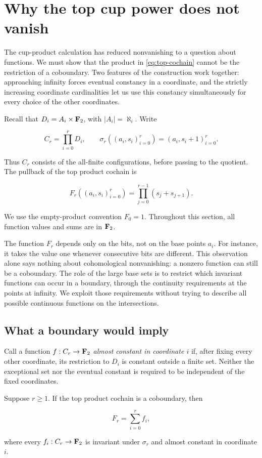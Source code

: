 \section{Why the top cup power does not vanish}\label{sec:nonvanishing}

The cup-product calculation has reduced nonvanishing to a question about
functions.  We must show that the product in \eqref{eq:top-cochain} cannot be
the restriction of a coboundary.  Two features of the construction work
together: approaching infinity forces eventual constancy in a coordinate,
and the strictly increasing coordinate cardinalities let us use this
constancy simultaneously for every choice of the other coordinates.

Recall that \(D_i=A_i\times\mathbf F_2\), with \(|A_i|=\aleph_i\).  Write

\[
C_r=\prod_{i=0}^{r}D_i,
\qquad
\sigma_r((a_i,s_i)_{i=0}^{r})=(a_i,s_i+1)_{i=0}^{r}.
\]

Thus \(C_r\) consists of the all-finite configurations, before passing to
the quotient.  The pullback of the top product cochain is

\[
F_r((a_i,s_i)_{i=0}^{r})
=\prod_{j=0}^{r-1}(s_j+s_{j+1}).
\]

We use the empty-product convention \(F_0=1\).  Throughout this section,
all function values and sums are in \(\mathbf F_2\).

The function \(F_r\) depends only on the bits, not on the base points
\(a_i\).  For instance, it takes the value one whenever consecutive bits
are different.  This observation alone says nothing about cohomological
nonvanishing: a nonzero function can still be a coboundary.  The role of the
large base sets is to restrict which invariant functions can occur in a
boundary, through the continuity requirements at the points at infinity.
We exploit those requirements without trying to describe all possible
continuous functions on the intersections.

\subsection{What a boundary would imply}

Call a function \(f:C_r\to\mathbf F_2\) \emph{almost constant in coordinate \(i\)}
if, after fixing every other coordinate, its restriction to \(D_i\) is
constant outside a finite set.  Neither the exceptional set nor the
eventual constant is required to be independent of the fixed coordinates.

\begin{lemma}\label{lem:boundary-necessary}
Suppose \(r\geq1\).  If the top product cochain is a coboundary, then

\[
F_r=\sum_{i=0}^{r}f_i,
\]

where every \(f_i:C_r\to\mathbf F_2\) is invariant under \(\sigma_r\) and almost
constant in coordinate \(i\).
\end{lemma}


